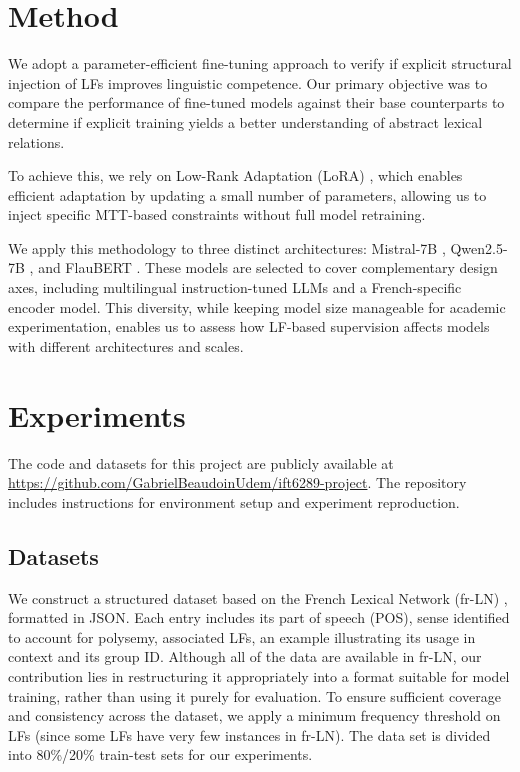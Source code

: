 \documentclass[11pt]{article}
\begin{document}
\section{Method}
We adopt a parameter-efficient fine-tuning approach to verify if explicit structural injection of LFs improves linguistic competence. Our primary objective was to compare the performance of fine-tuned models against their base counterparts to determine if explicit training yields a better understanding of abstract lexical relations.


To achieve this, we rely on Low-Rank Adaptation (LoRA) \citep{LoRA}, which enables efficient adaptation by updating a small number of parameters, allowing us to inject specific MTT-based constraints without full model retraining.

We apply this methodology to three distinct architectures: Mistral-7B \citep{jiangMistral7B2023}, Qwen2.5-7B \citep{qwen2}, and FlauBERT \citep{leFlauBERTUnsupervisedLanguage2020}. These models are selected to cover complementary design axes, including multilingual instruction-tuned LLMs and a French-specific encoder model. This diversity, while keeping model size manageable for academic experimentation, enables us to assess how LF-based supervision affects models with different architectures and scales.

\section{Experiments}
The code and datasets for this project are publicly available at \url{https://github.com/GabrielBeaudoinUdem/ift6289-project}. The repository includes instructions for environment setup and experiment reproduction.

\subsection{Datasets}
We construct a structured dataset based on the French Lexical Network (fr-LN) \citep{11403/lexical-system-fr/v3.2}, formatted in JSON. Each entry includes its part of speech (POS), sense identified to account for polysemy, associated LFs, an example illustrating its usage in context and its group ID. Although all of the data are available in fr-LN, our contribution lies in restructuring it appropriately into a format suitable for model training, rather than using it purely for evaluation. To ensure sufficient coverage and consistency across the dataset, we apply a minimum frequency threshold on LFs (since some LFs have very few instances in fr-LN). The data set is divided into 80\%/20\% train-test sets for our experiments.
\end{document}
